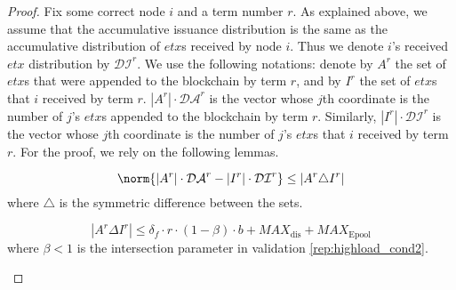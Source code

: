 \begin{proof}
Fix some correct node $i$ and a term number $r$. As explained above, we assume that the accumulative issuance distribution is the same as the accumulative distribution of $etx$s received by node $i$. Thus we denote $i$'s received $etx$ distribution by $\mathcal{DI}^r$. We use the following notations: denote by $A^r$ the set of $etx$s that were appended to the blockchain by term $r$, and by $I^{r}$ the set of $etx$s that $i$ received by term $r$. $|A^r|\cdot \mathcal{DA}^r$ is the vector whose $j$th coordinate is the number of $j$'s $etx$s appended to the blockchain by term $r$. Similarly, $|I^r|\cdot \mathcal{DI}^{r}$ is the vector whose $j$th coordinate is the number of $j$'s $etx$s that $i$ received by term $r$. 
For the proof, we rely on the following lemmas.



\begin{lemma} \label{lemma:rep_symetric}
\begin{equation} \label{eq:rep_symetric}
\norm{|A^r|\cdot \mathcal{DA}^r-|I^{r}|\cdot\mathcal{DI}^{r}}\leq \left | A^r \triangle I^{r} \right | 
\end{equation}
where $\triangle$ is the symmetric difference between the sets. 
\end{lemma}
\begin{lemma} \label{lemma:rep_AminusI} 
 \begin{equation}|A^r\Delta I^r |\leq \delta_f\cdot r \cdot (1-\beta)\cdot b+MAX_\text{dis}+MAX_\text{Epool}
 \end{equation}
 where $\beta<1$ is the intersection parameter in validation \ref{rep:highload_cond2}.
\end{lemma}




\end{proof}
